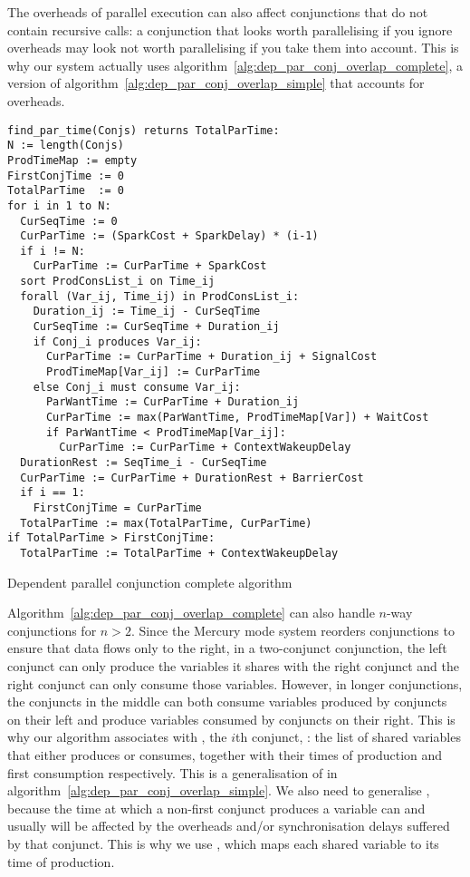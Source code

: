 The overheads of parallel execution can also affect conjunctions
that do not contain recursive calls:
a conjunction that looks worth parallelising if you ignore overheads
may look not worth parallelising if you take them into account.
This is why our system actually uses
algorithm~\ref{alg:dep_par_conj_overlap_complete},
a version of algorithm~\ref{alg:dep_par_conj_overlap_simple}
that accounts for overheads.

\begin{algorithm}
\begin{verbatim}
find_par_time(Conjs) returns TotalParTime:
N := length(Conjs)
ProdTimeMap := empty
FirstConjTime := 0
TotalParTime  := 0
for i in 1 to N:
  CurSeqTime := 0
  CurParTime := (SparkCost + SparkDelay) * (i-1)
  if i != N:
    CurParTime := CurParTime + SparkCost
  sort ProdConsList_i on Time_ij
  forall (Var_ij, Time_ij) in ProdConsList_i:
    Duration_ij := Time_ij - CurSeqTime
    CurSeqTime := CurSeqTime + Duration_ij
    if Conj_i produces Var_ij:
      CurParTime := CurParTime + Duration_ij + SignalCost
      ProdTimeMap[Var_ij] := CurParTime
    else Conj_i must consume Var_ij:
      ParWantTime := CurParTime + Duration_ij
      CurParTime := max(ParWantTime, ProdTimeMap[Var]) + WaitCost
      if ParWantTime < ProdTimeMap[Var_ij]:
        CurParTime := CurParTime + ContextWakeupDelay
  DurationRest := SeqTime_i - CurSeqTime
  CurParTime := CurParTime + DurationRest + BarrierCost
  if i == 1:
    FirstConjTime = CurParTime
  TotalParTime := max(TotalParTime, CurParTime)
if TotalParTime > FirstConjTime:
  TotalParTime := TotalParTime + ContextWakeupDelay
\end{verbatim}
\caption{Dependent parallel conjunction complete algorithm}
\label{alg:dep_par_conj_overlap_complete}
\end{algorithm}

Algorithm~\ref{alg:dep_par_conj_overlap_complete}
can also handle $n$-way conjunctions for $n>2$.
Since the Mercury mode system reorders conjunctions
to ensure that data flows only to the right,
in a two-conjunct conjunction,
the left conjunct can only produce
the variables it shares with the right conjunct
and the right conjunct can only consume
those variables.
However, in longer conjunctions,
the conjuncts in the middle
can both consume variables produced by conjuncts on their left
and produce variables consumed by conjuncts on their right.
This is why our algorithm associates with , the $i$th conjunct,
:
the list of shared variables that  either produces or consumes,
together with their times of production and first consumption respectively.
This is a generalisation of  in
algorithm~\ref{alg:dep_par_conj_overlap_simple}.
We also need to generalise ,
because the time at which a non-first conjunct produces a variable
can and usually will be affected
by the overheads and/or synchronisation delays suffered by that conjunct.
This is why we use ,
which maps each shared variable to its time of production.

